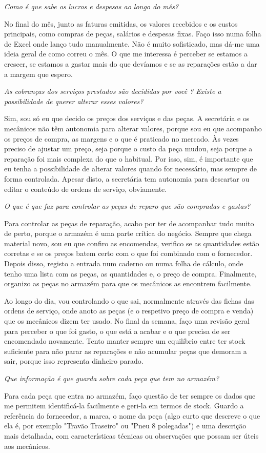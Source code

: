 \documentclass[11pt,a4paper]{article}
\newcommand{\pergunta}[1]{\item[P:] \textit{#1}}
\newcommand{\resposta}[1]{\item[R:] #1}
\begin{document}
\begin{transcription}
		\pergunta{Como é que sabe os lucros e despesas ao longo do mês?}
		\resposta{No final do mês, junto as faturas emitidas, os valores recebidos e os custos principais, como compras de peças, salários e despesas fixas. Faço isso numa folha de Excel onde lanço tudo manualmente. Não é muito sofisticado, mas dá-me uma ideia geral de como correu o mês. O que me interessa é perceber se estamos a crescer, se estamos a gastar mais do que devíamos e se as reparações estão a dar a margem que espero.}
		
		\pergunta{As cobranças dos serviços prestados são decididas por você ? Existe a possibilidade de querer alterar esses valores?}
		\resposta{Sim, sou só eu que decido os preços dos serviços e das peças. A secretária e os mecânicos não têm autonomia para alterar valores, porque sou eu que acompanho os preços de compra, as margens e o que é praticado no mercado. Às vezes preciso de ajustar um preço, seja porque o custo da peça mudou, seja porque a reparação foi mais complexa do que o habitual. Por isso, sim, é importante que eu tenha a possibilidade de alterar valores quando for necessário, mas sempre de forma controlada. Apesar disto, a secretária tem autonomia para descartar ou editar o conteúdo de ordens de serviço, obviamente.}
		
		\pergunta{O que é que faz para controlar as peças de reparo que são compradas e gastas?}
		\resposta{Para controlar as peças de reparação, acabo por ter de acompanhar tudo muito de perto, porque o armazém é uma parte crítica do negócio. Sempre que chega material novo, sou eu que confiro as encomendas, verifico se as quantidades estão corretas e se os preços batem certo com o que foi combinado com o fornecedor. Depois disso, registo a entrada num caderno ou numa folha de cálculo, onde tenho uma lista com as peças, as quantidades e, o preço de compra. Finalmente, organizo as peças no armazém para que os mecânicos as encontrem facilmente. 
			
			Ao longo do dia, vou controlando o que sai, normalmente através das fichas das ordens de serviço, onde anoto as peças (e o respetivo preço de compra e venda) que os mecânicos dizem ter usado. No final da semana, faço uma revisão geral para perceber o que foi gasto, o que está a acabar e o que precisa de ser encomendado novamente. Tento manter sempre um equilíbrio entre ter stock suficiente para não parar as reparações e não acumular peças que demoram a sair, porque isso representa dinheiro parado.}
		
		\pergunta{Que informação é que guarda sobre cada peça que tem no armazém?}
		\resposta{Para cada peça que entra no armazém, faço questão de ter sempre os dados que me permitem identificá-la facilmente e geri-la em termos de stock. Guardo a referência do fornecedor, a marca, o nome da peça (algo curto que descreve o que ela é, por exemplo "Travão Traseiro" ou "Pneu 8 polegadas") e uma descrição mais detalhada, com características técnicas ou observações que possam ser úteis aos mecânicos.
			
}
\end{transcription}
\end{document}
